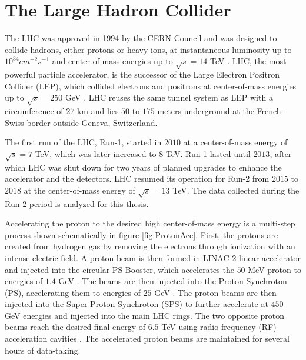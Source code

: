 \section{The Large Hadron Collider}
\label{sec:LHC}

The LHC was approved in 1994 by the CERN Council and was designed to collide hadrons, either protons or heavy ions, at instantaneous luminosity up to $10^{34}cm^{-2}s^{-1}$ and center-of-mass energies up to $\sqrt{s} = 14$ TeV \cite{LHCMachine}. LHC, the most powerful particle accelerator, is the successor of the Large Electron Positron Collider (LEP), which collided electrons and positrons at center-of-mass energies up to $\sqrt{s} = 250$ GeV \cite{LEP}. LHC reuses the same tunnel system as LEP with a circumference of $27$ km and lies $50$ to $175$ meters underground at the French-Swiss border outside Geneva, Switzerland. 

The first run of the LHC, Run-1, started in $2010$ at a center-of-mass energy of $\sqrt{s} = 7$ TeV, which was later increased to $8$ TeV. Run-1 lasted until $2013$, after which LHC was shut down for two years of planned upgrades to enhance the accelerator and the detectors. LHC resumed its operation for Run-2 from $2015$ to $2018$ at the center-of-mass energy of $\sqrt{s} = 13$ TeV. The data collected during the Run-2 period is analyzed for this thesis. 

Accelerating the proton to the desired high center-of-mass energy is a multi-step process shown schematically in figure \ref{fig:ProtonAcc}. First, the protons are created from hydrogen gas by removing the electrons through ionization with an intense electric field. A proton beam is then formed in LINAC 2 linear accelerator and injected into the circular PS Booster, which accelerates the $50$ MeV proton to energies of $1.4$ GeV \cite{LHCGuide}. The beams are then injected into the Proton Synchroton (PS), accelerating them to energies of $25$ GeV \cite{LHCGuide}. The proton beams are then injected into the Super Proton Synchroton (SPS) to further accelerate at $450$ GeV energies and injected into the main LHC rings. The two opposite proton beams reach the desired final energy of $6.5$ TeV using radio frequency (RF) acceleration cavities \cite{LHCGuide}. The accelerated proton beams are maintained for several hours of data-taking.

